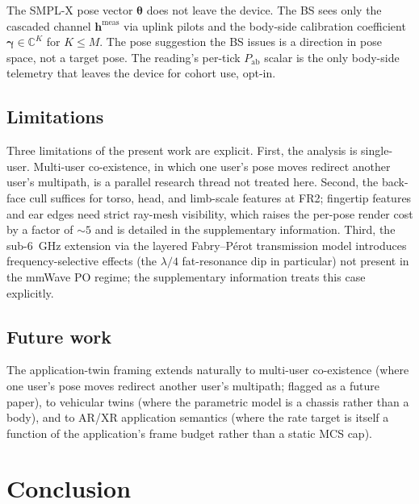 \documentclass[journal,twocolumn,10pt]{IEEEtran}
\theoremstyle{plain}
\theoremstyle{definition}
\theoremstyle{remark}
\newcommand{\hh}{\bm{h}}
\newcommand{\Pabs}{P_{\mathrm{ab}}}
\newcommand{\thetab}{\bm{\theta}}
\newcommand{\gammab}{\bm{\gamma}}
\newcommand{\Complex}{\mathbb{C}}
\begin{document}
The SMPL-X pose vector $\thetab$ does not leave the device. The BS
sees only the cascaded channel $\hh^{\mathrm{meas}}$ via uplink
pilots and the body-side calibration coefficient $\gammab \in
\Complex^{K}$ for $K \leq M$. The pose suggestion the BS issues is
a direction in pose space, not a target pose. The reading's per-tick
$\Pabs$ scalar is the only body-side telemetry that leaves the
device for cohort use, opt-in.

\subsection{Limitations}

Three limitations of the present work are explicit.
First, the analysis is single-user. Multi-user co-existence, in which
one user's pose moves redirect another user's multipath, is a
parallel research thread not treated here.
Second, the back-face cull suffices for torso, head, and limb-scale
features at FR2; fingertip features and ear edges need strict
ray-mesh visibility, which raises the per-pose render cost by a
factor of $\sim\!5$ and is detailed in the supplementary information.
Third, the sub-6~GHz extension via the layered Fabry--P\'erot
transmission model introduces frequency-selective effects (the
$\lambda/4$ fat-resonance dip in particular) not present in the
mmWave PO regime; the supplementary information treats this case
explicitly.

\subsection{Future work}

The application-twin framing extends naturally to multi-user
co-existence (where one user's pose moves redirect another user's
multipath; flagged as a future paper), to vehicular twins (where the
parametric model is a chassis rather than a body), and to AR/XR
application semantics (where the rate target is itself a function
of the application's frame budget rather than a static MCS cap).


\section{Conclusion}\label{sec:conclusion}
\end{document}

